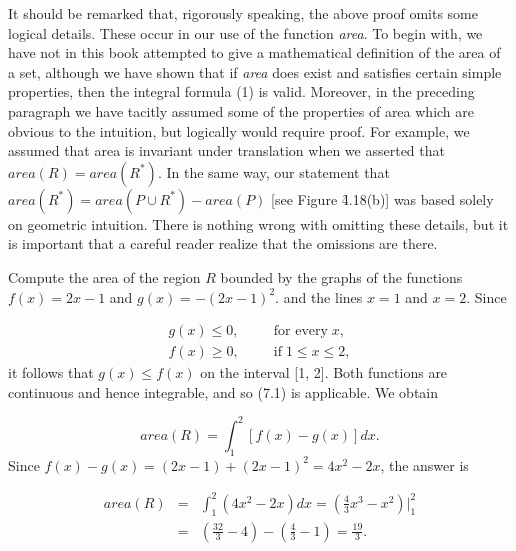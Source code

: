 It should be remarked that, rigorously speaking, the above proof omits some logical details. These occur in our use of the function \textit{area}. To begin with, we have not in this book attempted to give a mathematical definition of the area of a set, although we have shown that if \textit{area} does exist and satisfies certain simple properties, then the integral formula (1) is valid. Moreover, in the preceding paragraph we have tacitly assumed some of the properties of area which are obvious to the intuition, but logically would require proof. For example, we assumed that area is invariant under translation when we asserted that $area(R)= area(R^{*})$. In the same way, our statement that $area(R^{*}) = area(P \cup R^{*}) - area(P)$ [see Figure \f{4.18}(b)] was based solely on geometric intuition. There is nothing wrong with omitting these details, but it is important that a careful reader realize that the omissions are there.

\begin{example} 
Compute the area of the region $R$ bounded by the graphs of the functions $f(x) = 2x - 1$ and $g(x) = - (2x - 1)^2$. and the lines $x = 1$ and $x= 2$. Since

\begin{eqnarray*}
g(x) \leq 0, && \;\;\;\mbox{for every}\; x, \\
f(x) \geq 0, &&\;\;\;\mbox{if}\; 1 \leq x \leq 2,
\end{eqnarray*}
it follows that $g(x) \leq f(x)$ on the interval [1, 2]. Both functions are continuous and hence integrable, and so (7.1) is applicable. We obtain

$$
area(R) = \int_{1}^{2} [f(x) - g(x)] dx. 
$$
\noindent Since $f(x)-g(x) = (2x-1) + (2x-1)^2 = 4x^2 - 2x$, the answer is

\begin{eqnarray*}
area(R) &=& \int_{1}^{2} (4x^2 - 2x) dx = (\frac{4}{3}x^3 - x^2) \Big|_{1}^{2}\\
             &=& (\frac{32}{3} - 4) - (\frac{4}{3} - 1) = \frac{19}{3}. 
\end{eqnarray*}
\end{example}
\medskip

